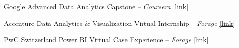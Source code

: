 \begin{zitemize}
    \setlength\itemsep{0.4em}
    \item Google Advanced Data Analytics Capstone – \textit{Coursera} 
    \href{https://www.coursera.org/account/accomplishments/specialization/8B4TJT28ZK4H}{[link]}

    \item Accenture Data Analytics \& Visualization Virtual Internship – \textit{Forage} 
    \href{https://forage-uploads-prod.s3.amazonaws.com/completion-certificates/Accenture%20North%20America/hzmoNKtzvAzXsEqx8_Accenture%20North%20America_DyNxQpfQM54NHDiJY_1721541932457_completion_certificate.pdf}{[link]}

    \item PwC Switzerland Power BI Virtual Case Experience – \textit{Forage} 
    \href{https://forage-uploads-prod.s3.amazonaws.com/completion-certificates/PwC%20Switzerland/a87GpgE6tiku7q3gu_PwC%20Switzerland_DyNxQpfQM54NHDiJY_1721730028976_completion_certificate.pdf}{[link]}
\end{zitemize}
